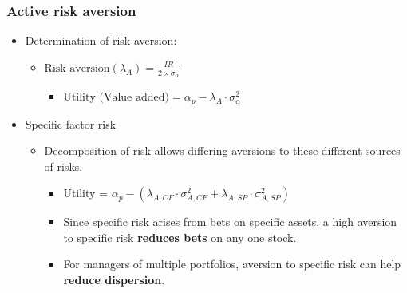 \subsubsection{Active risk aversion}
\begin{itemize}
\item Determination of risk aversion:
    \begin{itemize}
    \item \(\text{Risk aversion}(\lambda_A) = \frac{IR}{2 \times \sigma_{\alpha}}\)
        \begin{itemize}
        \item \(\text{Utility (Value added)} = \alpha_p - \lambda_A \cdot \sigma_{\alpha}^2\)
        \end{itemize}
    \end{itemize}
    
\item Specific factor risk
    \begin{itemize}
    \item Decomposition of risk allows differing aversions to these different sources of risks.
        \begin{itemize}
        \item Utility = $\alpha_p - (\lambda_{A,CF} \cdot \sigma_{A,CF}^2 + \lambda_{A,SP} \cdot \sigma_{A,SP}^2)$
        \item Since specific risk arises from bets on specific assets, a high aversion to specific risk \textbf{reduces bets} on any one stock.
        \item For managers of multiple portfolios, aversion to specific risk can help \textbf{reduce dispersion}.
        \end{itemize}
    \end{itemize}
    
\end{itemize}



